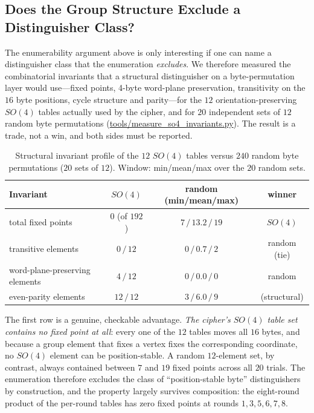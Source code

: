 \documentclass[review,12pt]{elsarticle}
\begin{document}
\subsection{Does the Group Structure Exclude a Distinguisher Class?}
\label{sec:group_invariants}
The enumerability argument above is only interesting if one can name a distinguisher class that the enumeration \emph{excludes}. We therefore measured the combinatorial invariants that a structural distinguisher on a byte-permutation layer would use---fixed points, 4-byte word-plane preservation, transitivity on the $16$ byte positions, cycle structure and parity---for the $12$ orientation-preserving $SO(4)$ tables actually used by the cipher, and for $20$ independent sets of $12$ random byte permutations (\url{tools/measure_so4_invariants.py}). The result is a trade, not a win, and both sides must be reported.

\begin{table}[htbp]
\caption{Structural invariant profile of the $12$ $SO(4)$ tables versus $240$ random byte permutations ($20$ sets of $12$). Window: min/mean/max over the $20$ random sets.}
\label{tab:group_invariants}
\centering
\small
\begin{tabular}{lccc}
\toprule
\textbf{Invariant} & \textbf{$SO(4)$} & \textbf{random (min/mean/max)} & \textbf{winner} \\
\midrule
total fixed points            & $0$ (of $192$) & $7\,/\,13.2\,/\,19$ & $SO(4)$ \\
transitive elements           & $0\,/\,12$     & $0\,/\,0.7\,/\,2$   & random (tie) \\
word-plane-preserving elements& $4\,/\,12$     & $0\,/\,0.0\,/\,0$   & random \\
even-parity elements          & $12\,/\,12$    & $3\,/\,6.0\,/\,9$   & (structural) \\
\bottomrule
\end{tabular}
\end{table}

The first row is a genuine, checkable advantage. \emph{The cipher's $SO(4)$ table set contains no fixed point at all}: every one of the $12$ tables moves all $16$ bytes, and because a group element that fixes a vertex fixes the corresponding coordinate, no $SO(4)$ element can be position-stable. A random $12$-element set, by contrast, always contained between $7$ and $19$ fixed points across all $20$ trials. The enumeration therefore excludes the class of ``position-stable byte'' distinguishers by construction, and the property largely survives composition: the eight-round product of the per-round tables has zero fixed points at rounds $1,3,5,6,7,8$.
\end{document}
